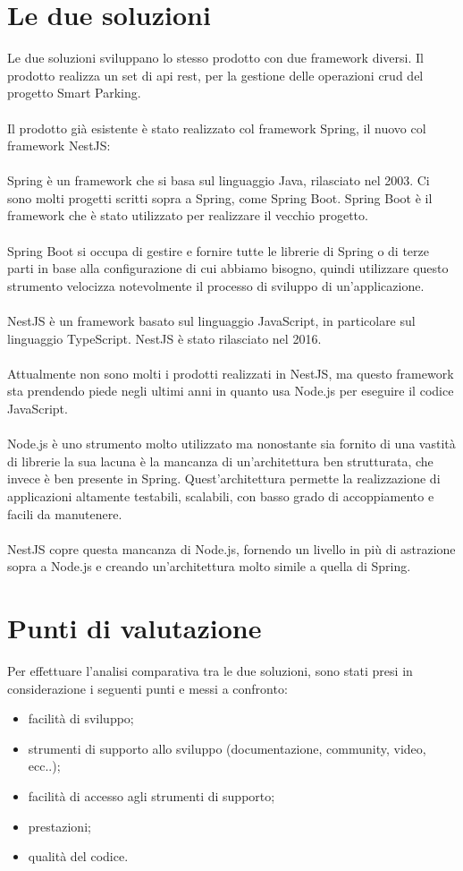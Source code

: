 \section{Le due soluzioni}
Le due soluzioni sviluppano lo stesso prodotto con due framework diversi.
Il prodotto realizza un set di \gls{api} \gls{rest}, per la gestione delle operazioni \gls{crud} del
progetto Smart Parking.
\\\\
Il prodotto già esistente è stato realizzato col framework Spring, il nuovo col framework NestJS:
\\\\
Spring è un framework che si basa sul linguaggio Java, rilasciato nel 2003. Ci sono molti progetti scritti
sopra a Spring, come Spring Boot. Spring Boot è il framework che è stato utilizzato per realizzare il vecchio progetto.
\\\\
Spring Boot si occupa di gestire
e fornire tutte le librerie di Spring o di terze parti in base alla configurazione di cui abbiamo bisogno, quindi 
utilizzare questo strumento velocizza notevolmente il processo di sviluppo di un'applicazione.
\\\\
NestJS è un framework basato sul linguaggio JavaScript, in particolare sul linguaggio TypeScript. NestJS è
stato rilasciato nel 2016.
\\\\
Attualmente non sono molti i prodotti realizzati in NestJS, ma questo framework sta prendendo piede negli ultimi anni in quanto
usa Node.js per eseguire il codice JavaScript.
\\\\
Node.js è uno strumento molto utilizzato ma nonostante sia fornito di una vastità di librerie la sua lacuna è la mancanza
di un'architettura ben strutturata, che invece è ben presente in Spring. Quest'architettura 
permette la realizzazione di applicazioni altamente testabili, scalabili, con basso grado di accoppiamento
e facili da manutenere.
\\\\
NestJS copre questa mancanza di Node.js, fornendo un livello in più di astrazione sopra a Node.js e creando un'architettura 
molto simile a quella di Spring.
\section{Punti di valutazione}
Per effettuare l'analisi comparativa tra le due soluzioni, sono stati presi in considerazione i seguenti 
punti e messi a confronto:
\begin{itemize}
    \item facilità di sviluppo;
    \item strumenti di supporto allo sviluppo (documentazione, community, video, ecc..);
    \item facilità di accesso agli strumenti di supporto;
    \item prestazioni;
    \item qualità del codice.
\end{itemize}

